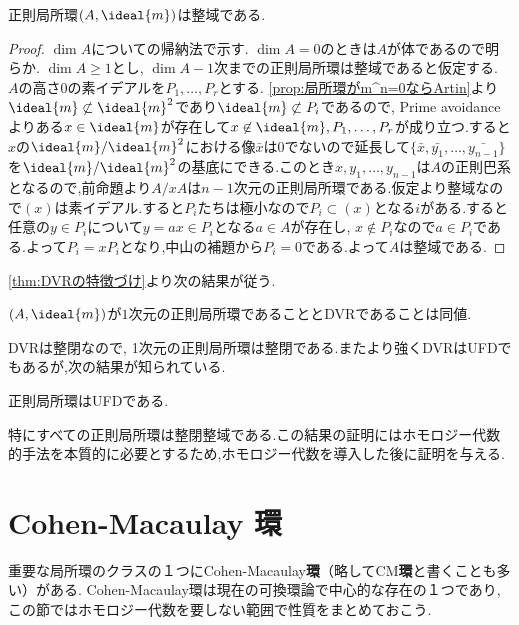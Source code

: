 \begin{thm}
	正則局所環$(A,\ideal{m})$は整域である.
\end{thm}

\begin{proof}
	$\dim A$についての帰納法で示す. $\dim A=0$のときは$A$が体であるので明らか. $\dim A\geq 1$とし, $\dim A-1$次までの正則局所環は整域であると仮定する. $A$の高さ$0$の素イデアルを$P_1,\dots,P_r$とする. \ref{prop:局所環がm^n=0ならArtin}より$\ideal{m}\not\subset\ideal{m}^2$であり$\ideal{m}\not\subset P_i$であるので, Prime avoidanceよりある$x\in\ideal{m}$が存在して$x\not\in\ideal{m},P_1,\dots,P_r$が成り立つ.すると$x$の$\ideal{m}/\ideal{m}^2$における像$\bar{x}$は$0$でないので延長して$\{\bar{x},\bar{y_1},\dots,\bar{y_{n-1}}\}$を$\ideal{m}/\ideal{m}^2$の基底にできる.このとき$x,y_1,\dots,y_{n-1}$は$A$の正則巴系となるので,前命題より$A/xA$は$n-1$次元の正則局所環である.仮定より整域なので$(x)$は素イデアル.すると$P_i$たちは極小なので$P_i\subset(x)$となる$i$がある.すると任意の$y\in P_i$について$y=ax\in P_i$となる$a\in A$が存在し, $x\not\in P_i$なので$a\in P_i$である.よって$P_i=xP_i$となり,中山の補題から$P_i=0$である.よって$A$は整域である.
\end{proof}

\ref{thm:DVRの特徴づけ}より次の結果が従う.

\begin{cor}
	$(A,\ideal{m})$が$1$次元の正則局所環であることとDVRであることは同値.
\end{cor}

DVRは整閉なので, 1次元の正則局所環は整閉である.またより強くDVRはUFDでもあるが,次の結果が知られている.

\begin{thm}
	正則局所環はUFDである.
\end{thm}

特にすべての正則局所環は整閉整域である.この結果の証明にはホモロジー代数的手法を本質的に必要とするため,ホモロジー代数を導入した後に証明を与える.

\section{Cohen-Macaulay 環}

重要な局所環のクラスの１つにCohen-Macaulay\textbf{環}（略してCM\textbf{環}と書くことも多い）がある. Cohen-Macaulay環は現在の可換環論で中心的な存在の１つであり,この節ではホモロジー代数を要しない範囲で性質をまとめておこう.

